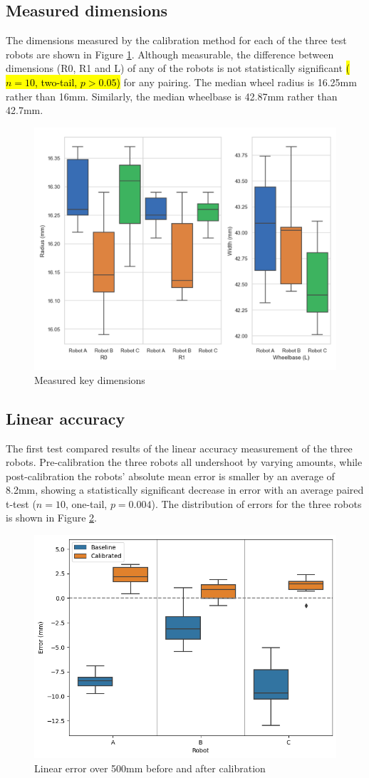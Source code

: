 \documentclass[conference]{IEEEtran}
\begin{document}
\subsection{Measured dimensions}

The dimensions measured by the calibration method for each of the three test robots are shown in Figure \ref{fig:r0r1L}. Although measurable, the difference between dimensions (R0, R1 and L) of any of the robots is not statistically significant \hl{($n = 10$, two-tail, $p > 0.05 $)} for any pairing. The median wheel radius is 16.25mm rather than 16mm. Similarly, the median wheelbase is 42.87mm rather than 42.7mm.

\begin{figure}[h]
    \centering
    \includegraphics[width=.5\textwidth]{img/r0r1l.png}
    \caption{Measured key dimensions}
    \label{fig:r0r1L}
\end{figure}

\subsection{Linear accuracy}

The first test compared results of the linear accuracy measurement of the three robots. 
Pre-calibration the three robots all undershoot by varying amounts, while post-calibration the robots' absolute mean error is smaller by an average of 8.2mm, showing a statistically significant decrease in error with an average paired t-test ($n = 10$, one-tail, $p = 0.004$). The distribution of errors for the three robots is shown in Figure \ref{fig:linear}.

\begin{figure}[h]
    \centering
    \includegraphics[width=.45\textwidth]{img/linear_pre_post.png}
    \caption{Linear error over 500mm before and after calibration}
    \label{fig:linear}
\end{figure}
\end{document}
